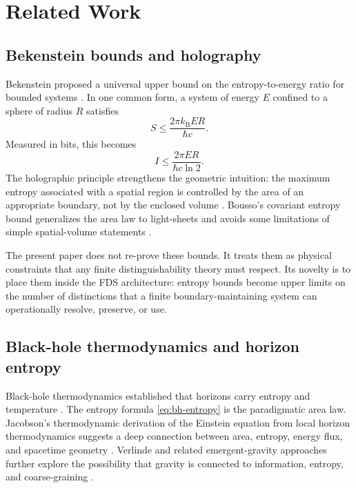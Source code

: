 \documentclass[10pt,a4paper,twocolumn,aps,prl]{revtex4-2}
\newcommand{\kB}{k_{\mathrm B}}
\begin{document}
\section{Related Work}

\subsection{Bekenstein bounds and holography}

Bekenstein proposed a universal upper bound on the entropy-to-energy ratio for bounded systems \cite{bekenstein1981}. In one common form, a system of energy $E$ confined to a sphere of radius $R$ satisfies
\begin{equation}
S \leq \frac{2\pi \kB E R}{\hbar c}.
\label{eq:bekenstein}
\end{equation}
Measured in bits, this becomes
\begin{equation}
I \leq \frac{2\pi E R}{\hbar c\ln 2}.
\label{eq:bekenstein-bits}
\end{equation}
The holographic principle strengthens the geometric intuition: the maximum entropy associated with a spatial region is controlled by the area of an appropriate boundary, not by the enclosed volume \cite{thooft1993,susskind1995,bousso2002}. Bousso's covariant entropy bound generalizes the area law to light-sheets and avoids some limitations of simple spatial-volume statements \cite{bousso2002}.

The present paper does not re-prove these bounds. It treats them as physical constraints that any finite distinguishability theory must respect. Its novelty is to place them inside the FDS architecture: entropy bounds become upper limits on the number of distinctions that a finite boundary-maintaining system can operationally resolve, preserve, or use.

\subsection{Black-hole thermodynamics and horizon entropy}

Black-hole thermodynamics established that horizons carry entropy and temperature \cite{bekenstein1973,hawking1975}. The entropy formula \eqref{eq:bh-entropy} is the paradigmatic area law. Jacobson's thermodynamic derivation of the Einstein equation from local horizon thermodynamics suggests a deep connection between area, entropy, energy flux, and spacetime geometry \cite{jacobson1995}. Verlinde and related emergent-gravity approaches further explore the possibility that gravity is connected to information, entropy, and coarse-graining \cite{verlinde2011}.
\end{document}
